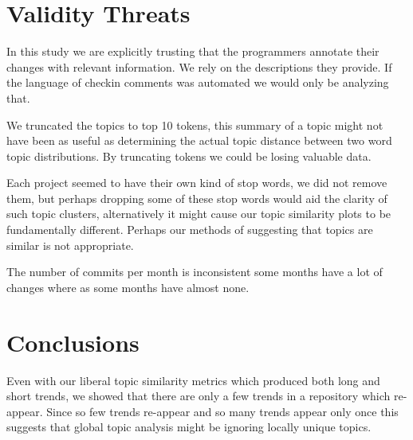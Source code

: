 \documentclass[times, 10pt,twocolumn]{article}
\begin{document}


\section{Validity Threats}

In this study we are explicitly trusting that the programmers annotate
their changes with relevant information. We rely on the descriptions
they provide. If the language of checkin comments was automated we
would only be analyzing that.

We truncated the topics to top 10 tokens, this summary of a topic
might not have been as useful as determining the actual topic distance
between two word topic distributions. By truncating tokens we could be
losing valuable data.

Each project seemed to have their own kind of stop words, we did not
remove them, but perhaps dropping some of these stop words would aid
the clarity of such topic clusters, alternatively it might cause our
topic similarity plots to be fundamentally different. Perhaps our
methods of suggesting that topics are similar is not appropriate.

The number of commits per month is inconsistent some months have a lot
of changes where as some months have almost none.






\section{Conclusions}

Even with our liberal topic similarity metrics which produced both
long and short trends, we showed that there are only a few trends in a
repository which re-appear. Since so few trends re-appear and so many
trends appear only once this suggests that global topic analysis might
be ignoring locally unique topics. 
\end{document}
